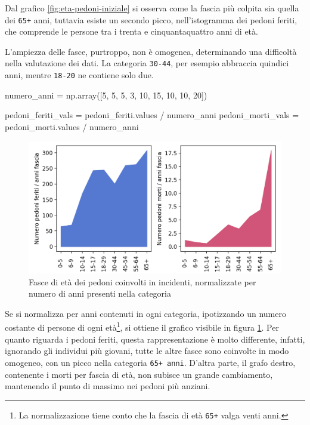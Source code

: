 \documentclass[a4paper,12pt]{report}
\newcommand{\columnstyle}[1]{\texttt{#1}}
\begin{document}
Dal grafico \ref{fig:eta-pedoni-iniziale} si osserva come la fascia più colpita 
sia quella dei \columnstyle{65+} anni, tuttavia esiste un secondo picco, nell'istogramma 
dei pedoni feriti, che comprende le persone tra i trenta e cinquantaquattro anni di età. 

L'ampiezza delle fasce, purtroppo, non è omogenea, determinando una difficoltà 
nella valutazione dei dati.
La categoria 
\columnstyle{30-44}, per esempio abbraccia quindici anni, mentre 
\columnstyle{18-20} ne contiene solo due. 

\begin{code}[language=Python]
numero_anni = np.array([5, 5, 5, 3, 10, 15, 10, 10, 20])

pedoni_feriti_vals = pedoni_feriti.values / numero_anni
pedoni_morti_vals = pedoni_morti.values / numero_anni
\end{code}

\begin{figure}
    \includegraphics[width=\linewidth]{../src/incidenti/incidenti_senza_coords/pedoni/eta_pedoni.png}
    \caption{Fasce di età dei pedoni coinvolti in incidenti, normalizzate per numero di anni 
    presenti nella categoria}
    \label{fig:eta-pedoni}
\end{figure}

Se si normalizza per anni contenuti in ogni categoria, ipotizzando un numero 
costante di persone di ogni età\footnote{La normalizzazione tiene conto 
che la fascia di età \columnstyle{65+} valga venti anni.}, 
si ottiene il grafico visibile in figura \ref{fig:eta-pedoni}. 
Per quanto riguarda i pedoni feriti, 
questa rappresentazione è molto differente, infatti, 
ignorando gli individui più giovani, tutte le altre fasce sono coinvolte 
in modo omogeneo, con un picco nella categoria \columnstyle{65+ anni}. 
D'altra parte, il grafo destro, contenente i morti per fascia di età, 
non subisce un grande cambiamento, mantenendo il punto di massimo nei 
pedoni più anziani. 
\end{document}
